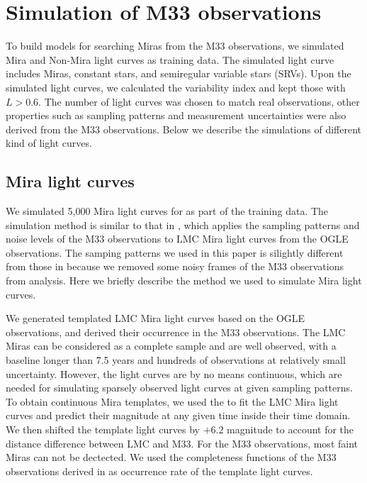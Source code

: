 \section{Simulation of M33 observations} \label{sec.simulation}

To build models for searching Miras from the M33 observations, we simulated Mira and Non-Mira light curves as training data. The simulated light curve includes Miras, constant stars, and semiregular variable stars (SRVs). Upon the simulated light curves, we calculated the variability index and kept those with $L>0.6$. The number of light curves was chosen to match real observations, other properties such as sampling patterns and measurement uncertainties were also derived from the M33 observations. Below we describe the simulations of different kind of light curves.

\subsection{Mira light curves}
We simulated 5,000 Mira light curves for as part of the training data. The simulation method is similar to that in , which applies the sampling patterns and noise levels of the M33 observations to LMC Mira light curves from the OGLE observations. The samping patterns we used in this paper is silightly different from those in  because we removed some noisy frames of the M33 observations from analysis. Here we briefly describe the method we used to simulate Mira light curves.

We generated templated LMC Mira light curves based on the OGLE observations, and derived their occurrence in the M33 observations. The LMC Miras can be considered as a complete sample and are well observed, with a baseline longer than 7.5 years and hundreds of observations at relatively small uncertainty. However, the light curves are by no means continuous, which are needed for simulating sparsely observed light curves at given sampling patterns. To obtain continuous Mira templates, we used the  to fit the LMC Mira light curves and predict their magnitude at any given time inside their time domain. We then shifted the template light curves by $+6.2$ magnitude to account for the distance difference between LMC and M33. For the M33 observations, most faint Miras can not be dectected. We used the completeness functions of the M33 observations derived in  as occurrence rate of the template light curves.

